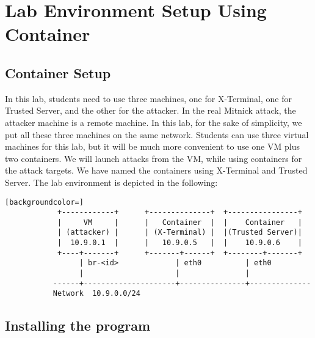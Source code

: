 \section{Lab Environment Setup Using Container}



\subsection{Container Setup}

In this lab, students need to use three machines, 
one for X-Terminal, one for Trusted Server, and the other for the attacker. 
In the real Mitnick attack, the attacker machine is a remote machine. 
In this lab, for the 
sake of simplicity, we put all these three machines on the same network. 
Students can use three virtual
machines for this lab, but it will be much more convenient to
use one VM plus two containers.  We will launch
attacks from the VM, while using containers for the attack targets. 
We have named the containers using X-Terminal and Trusted Server.
The lab environment is depicted in the following:


\begin{lstlisting}[backgroundcolor=]
            +------------+      +--------------+  +----------------+  
            |     VM     |      |   Container  |  |    Container   |  
            | (attacker) |      | (X-Terminal) |  |(Trusted Server)|  
            |  10.9.0.1  |      |   10.9.0.5   |  |    10.9.0.6    |  
            +----+-------+      +-------+------+  +--------+-------+  
                 | br-<id>             | eth0          | eth0   
                 |                     |               |        
           ------+---------------------+---------------+--------------
           Network  10.9.0.0/24

\end{lstlisting}









\subsection{Installing the \rsh program}

